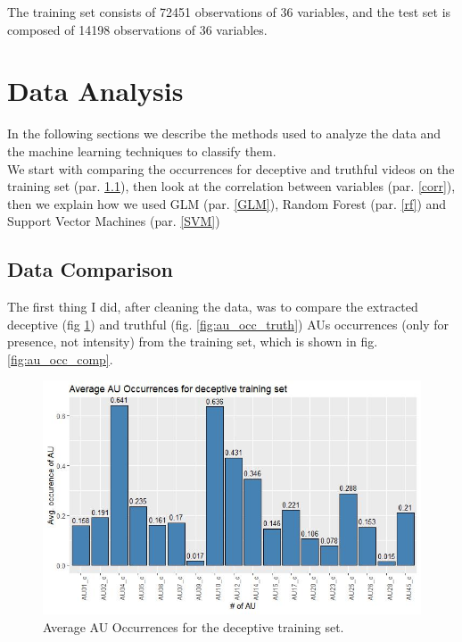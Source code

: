 The training set consists of 72451 observations of 36 variables, and the test set is composed of 14198 observations of 36 variables.

\clearpage

\section{Data Analysis} \label{data_an}
In the following sections we describe the methods used to analyze the data and the machine learning techniques to classify them. \\
We start with comparing the occurrences for deceptive and truthful videos on the training set (par. \ref{data_comp}), then look at the correlation between variables (par. \ref{corr}), then we explain how we used GLM (par. \ref{GLM}), Random Forest (par. \ref{rf}) and Support Vector Machines (par. \ref{SVM})

\subsection{Data Comparison} \label{data_comp}
The first thing I did, after cleaning the data, was to compare the extracted deceptive (fig \ref{fig:au_occ_dec}) and truthful (fig. \ref{fig:au_occ_truth}) AUs occurrences (only for presence, not intensity) from the training set, which is shown in fig. \ref{fig:au_occ_comp}.

\begin{figure}[H]
	\centering
	\includegraphics[width=1\textwidth]{images/au_occ_dec}
	\caption{Average AU Occurrences for the deceptive training set.}
	\label{fig:au_occ_dec}
\end{figure}

\clearpage

